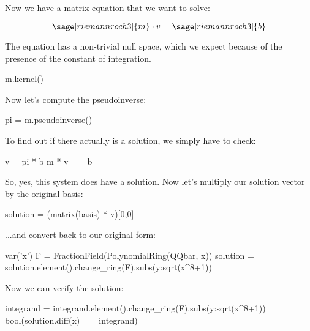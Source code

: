 Now we have a matrix equation that we want to solve:

$$\sage[riemannroch3]{m} \cdot v = \sage[riemannroch3]{b}$$

The equation has a non-trivial null space, which we expect because
of the presence of the constant of integration.

\begin{sageblock}[riemannroch3]
m.kernel()
\end{sageblock}

Now let's compute the pseudoinverse:

\begin{sageblock}[riemannroch3]
pi = m.pseudoinverse()
\end{sageblock}

To find out if there actually is a solution, we simply have to check:

\begin{sageblock}[riemannroch3]
v = pi * b
m * v == b
\end{sageblock}

So, yes, this system does have a solution.  Now let's multiply our
solution vector by the original basis:

\begin{sageblock}[riemannroch3]
solution = (matrix(basis) * v)[0,0]
\end{sageblock}

...and convert back to our original form:

\begin{sageblock}[riemannroch3]
var('x')
F = FractionField(PolynomialRing(QQbar, x))
solution = solution.element().change_ring(F).subs({y:sqrt(x^8+1)})
\end{sageblock}

Now we can verify the solution:

\begin{sageblock}[riemannroch3]
integrand = integrand.element().change_ring(F).subs({y:sqrt(x^8+1)})
bool(solution.diff(x) == integrand)
\end{sageblock}



\endexample


\vfill\eject
{}

